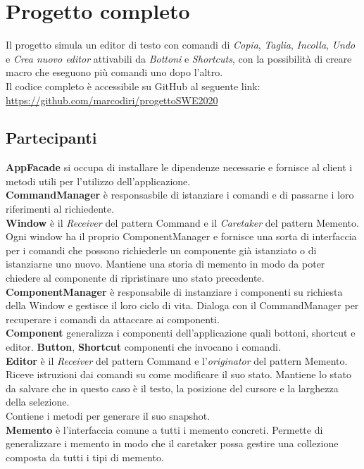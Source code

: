 \documentclass[12pt]{article}
\begin{document}
\newpage
\section{Progetto completo}
Il progetto simula un editor di testo con comandi di \emph{Copia}, \emph{Taglia}, \emph{Incolla}, \emph{Undo} e \emph{Crea nuovo editor} attivabili da \emph{Bottoni} e \emph{Shortcuts}, con la possibilità di creare macro che eseguono più comandi uno dopo l'altro.\\
Il codice completo è accessibile su GitHub al seguente link: \url{https://github.com/marcodiri/progettoSWE2020}

\subsection{Partecipanti}
\textbf{AppFacade} si occupa di installare le dipendenze necessarie e fornisce al client i metodi utili per l'utilizzo dell'applicazione. \\
\textbf{CommandManager} è responsasbile di istanziare i comandi e di passarne i loro riferimenti al richiedente. \\
\textbf{Window} è il \emph{Receiver} del pattern Command e il \emph{Caretaker} del pattern Memento. Ogni window ha il proprio ComponentManager e fornisce una sorta di interfaccia per i comandi che possono richiederle un componente già istanziato o di istanziarne uno nuovo. Mantiene una storia di memento in modo da poter chiedere al componente di ripristinare uno stato precedente.\\
\textbf{ComponentManager} è responsabile di instanziare i componenti su richiesta della Window e gestisce il loro ciclo di vita. Dialoga con il CommandManager per recuperare i comandi da attaccare ai componenti. \\
\textbf{Component} generalizza i componenti dell'applicazione quali bottoni, shortcut e editor.
\textbf{Button}, \textbf{Shortcut} componenti che invocano i comandi.\\
\textbf{Editor} è il \emph{Receiver} del pattern Command e l'\emph{originator} del pattern Memento. Riceve istruzioni dai comandi su come modificare il suo stato. Mantiene lo stato da salvare che in questo caso è il testo, la posizione del cursore e la larghezza della selezione.\\
Contiene i metodi per generare il suo snapshot.\\
\textbf{Memento} è l'interfaccia comune a tutti i memento concreti. Permette di generalizzare i memento in modo che il caretaker possa gestire una collezione composta da tutti i tipi di memento. \\
\end{document}
